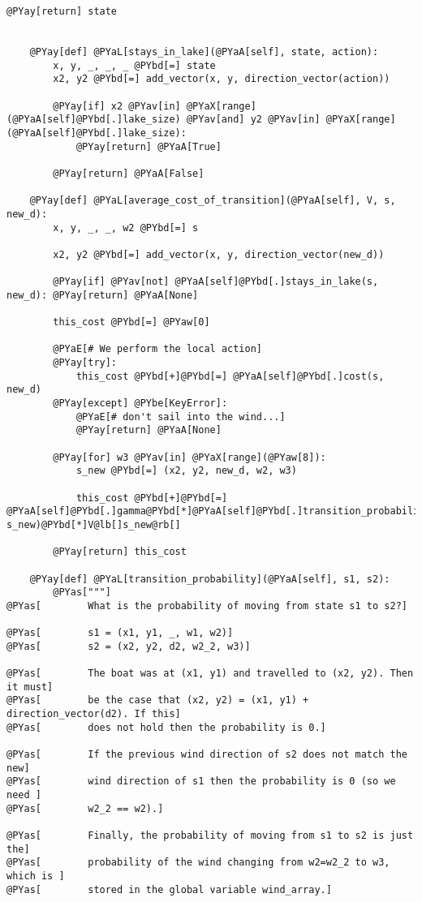 \begin{Verbatim}[commandchars=@\[\]]
        @PYay[return] state


    @PYay[def] @PYaL[stays_in_lake](@PYaA[self], state, action):
        x, y, _, _, _ @PYbd[=] state
        x2, y2 @PYbd[=] add_vector(x, y, direction_vector(action))

        @PYay[if] x2 @PYav[in] @PYaX[range](@PYaA[self]@PYbd[.]lake_size) @PYav[and] y2 @PYav[in] @PYaX[range](@PYaA[self]@PYbd[.]lake_size):
            @PYay[return] @PYaA[True]

        @PYay[return] @PYaA[False]

    @PYay[def] @PYaL[average_cost_of_transition](@PYaA[self], V, s, new_d):
        x, y, _, _, w2 @PYbd[=] s

        x2, y2 @PYbd[=] add_vector(x, y, direction_vector(new_d))

        @PYay[if] @PYav[not] @PYaA[self]@PYbd[.]stays_in_lake(s, new_d): @PYay[return] @PYaA[None]

        this_cost @PYbd[=] @PYaw[0]

        @PYaE[# We perform the local action]
        @PYay[try]:
            this_cost @PYbd[+]@PYbd[=] @PYaA[self]@PYbd[.]cost(s, new_d)
        @PYay[except] @PYbe[KeyError]:
            @PYaE[# don't sail into the wind...]
            @PYay[return] @PYaA[None]

        @PYay[for] w3 @PYav[in] @PYaX[range](@PYaw[8]):
            s_new @PYbd[=] (x2, y2, new_d, w2, w3)

            this_cost @PYbd[+]@PYbd[=] @PYaA[self]@PYbd[.]gamma@PYbd[*]@PYaA[self]@PYbd[.]transition_probability(s, s_new)@PYbd[*]V@lb[]s_new@rb[] 

        @PYay[return] this_cost

    @PYay[def] @PYaL[transition_probability](@PYaA[self], s1, s2):
        @PYas["""]
@PYas[        What is the probability of moving from state s1 to s2?]

@PYas[        s1 = (x1, y1, _, w1, w2)]
@PYas[        s2 = (x2, y2, d2, w2_2, w3)]

@PYas[        The boat was at (x1, y1) and travelled to (x2, y2). Then it must]
@PYas[        be the case that (x2, y2) = (x1, y1) + direction_vector(d2). If this]
@PYas[        does not hold then the probability is 0.]

@PYas[        If the previous wind direction of s2 does not match the new]
@PYas[        wind direction of s1 then the probability is 0 (so we need ]
@PYas[        w2_2 == w2).]

@PYas[        Finally, the probability of moving from s1 to s2 is just the]
@PYas[        probability of the wind changing from w2=w2_2 to w3, which is ]
@PYas[        stored in the global variable wind_array.]


\end{Verbatim}
